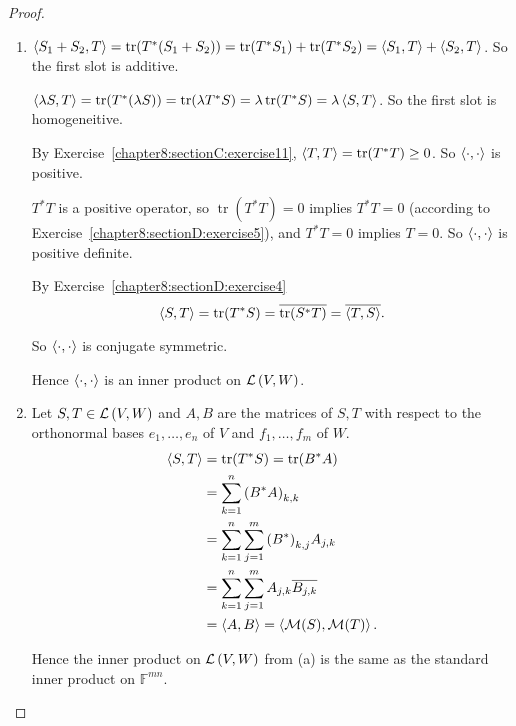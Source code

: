 \begin{proof}
    \begin{enumerate}[label={(\alph*)}]
        \item $\left\langle{S_{1} + S_{2}, T}\right\rangle = \operatorname{tr}(T^{*}(S_{1} + S_{2})) = \operatorname{tr}(T^{*}S_{1}) + \operatorname{tr}(T^{*}S_{2}) = \left\langle{S_{1}, T}\right\rangle + \left\langle{S_{2}, T}\right\rangle$. So the first slot is additive.

              $\left\langle{\lambda S, T}\right\rangle = \operatorname{tr}(T^{*}(\lambda S)) = \operatorname{tr}(\lambda T^{*}S) = \lambda\operatorname{tr}(T^{*}S) = \lambda\left\langle{S, T}\right\rangle$. So the first slot is homogeneitive.

              By Exercise~\ref{chapter8:sectionC:exercise11}, $\left\langle{T, T}\right\rangle = \operatorname{tr}(T^{*}T)\geq 0$. So $\left\langle{\cdot,\cdot}\right\rangle$ is positive.

              $T^{*}T$ is a positive operator, so $\operatorname{tr}(T^{*}T) = 0$ implies $T^{*}T = 0$ (according to Exercise~\ref{chapter8:sectionD:exercise5}), and $T^{*}T = 0$ implies $T = 0$. So $\left\langle{\cdot,\cdot}\right\rangle$ is positive definite.

              By Exercise~\ref{chapter8:sectionD:exercise4}
              \[
                  \left\langle{S, T}\right\rangle = \operatorname{tr}(T^{*}S) = \overline{\operatorname{tr}(S^{*}T)} = \overline{\left\langle{T, S}\right\rangle}.
              \]

              So $\left\langle{\cdot,\cdot}\right\rangle$ is conjugate symmetric.

              Hence $\left\langle{\cdot,\cdot}\right\rangle$ is an inner product on $\mathcal{L}\left({V, W}\right)$.
        \item Let $S, T\in\mathcal{L}\left({V, W}\right)$ and $A, B$ are the matrices of $S, T$ with respect to the orthonormal bases $e_{1}, \ldots, e_{n}$ of $V$ and $f_{1}, \ldots, f_{m}$ of $W$.
              \begin{align*}
                  \left\langle{S, T}\right\rangle & = \operatorname{tr}(T^{*}S) = \operatorname{tr}(B^{*}A)          \\
                                   & = \sum^{n}_{k=1}{(B^{*}A)}_{k,k}                                 \\
                                   & = \sum^{n}_{k=1}\sum^{m}_{j=1}{(B^{*})}_{k,j}A_{j,k}             \\
                                   & = \sum^{n}_{k=1}\sum^{m}_{j=1}A_{j,k}\overline{B_{j,k}}              \\
                                   & = \left\langle{A, B}\right\rangle = \left\langle{\mathcal{M}(S), \mathcal{M}(T)}\right\rangle.
              \end{align*}

              Hence the inner product on $\mathcal{L}\left({V, W}\right)$ from (a) is the same as the standard inner product on $\mathbb{F}^{mn}$.
    \end{enumerate}
\end{proof}
\newpage

